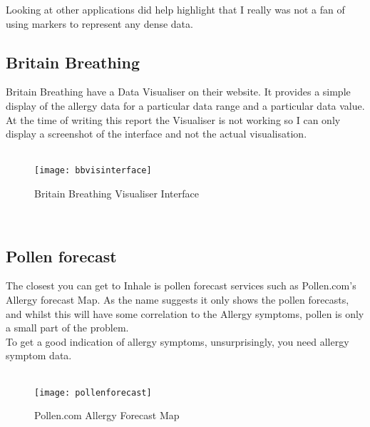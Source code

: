 Looking at other applications did help highlight that I really was not a fan of using markers to represent any dense data.



\subsection{Britain Breathing}
Britain Breathing have a Data Visualiser on their website. It provides a simple display of the allergy data for a particular data range and a particular data value. At the time of writing this report the Visualiser is not working so I can only display a screenshot of the interface and not the actual visualisation.

\begin{SCfigure}
\caption{Britain Breathing Visualiser Interface}\\
\centering
\texttt{[image: bbvisinterface]}
\centering
\end{SCfigure}\\

\subsection{Pollen forecast}

The closest you can get to Inhale is pollen forecast services such as Pollen.com's Allergy forecast Map. As the name suggests it only shows the pollen forecasts, and whilst this will have some correlation to the Allergy symptoms, pollen is only a small part of the problem.\\

To get a good indication of allergy symptoms, unsurprisingly, you need allergy symptom data.\\

\begin{SCfigure}
\caption{Pollen.com Allergy Forecast Map}\\
\centering
\texttt{[image: pollenforecast]}
\centering
\end{SCfigure}\\

